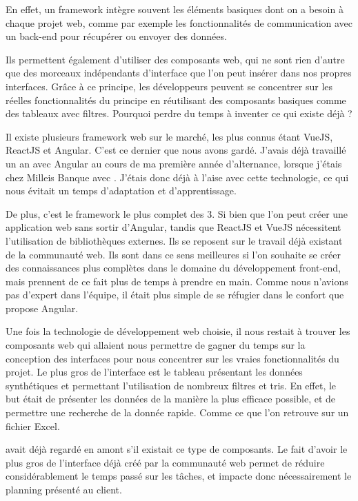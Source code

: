 En effet, un \gls{framework} intègre souvent les éléments basiques dont on a besoin à chaque projet web, comme par exemple les fonctionnalités de communication avec un \gls{back-end} pour récupérer ou envoyer des données.

Ils permettent également d'utiliser des \og composants \fg web, qui ne sont rien d'autre que des morceaux indépendants d'interface que l'on peut insérer dans nos propres interfaces. Grâce à ce principe, les développeurs peuvent se concentrer sur les réelles fonctionnalités du principe en réutilisant des composants basiques comme des tableaux avec filtres. Pourquoi perdre du temps à inventer ce qui existe déjà ?

Il existe plusieurs \gls{framework} web sur le marché, les plus connus étant VueJS\cite{noauthor_vuejs_nodate}, ReactJS\cite{noauthor_react_nodate} et Angular\cite{noauthor_angular_nodate}. C'est ce dernier que nous avons gardé. J'avais déjà travaillé un an avec Angular au cours de ma première année d'alternance, lorsque j'étais chez Milleis Banque avec \damien. J'étais donc déjà à l'aise avec cette technologie, ce qui nous évitait un temps d'adaptation et d'apprentissage.

De plus, c'est le \gls{framework} le plus complet des 3. Si bien que l'on peut créer une application web sans sortir d'Angular, tandis que ReactJS et VueJS nécessitent l'utilisation de bibliothèques externes. Ils se reposent sur le travail déjà existant de la communauté web. Ils sont dans ce sens meilleures si l'on souhaite se créer des connaissances plus complètes dans le domaine du développement \gls{front-end}, mais prennent de ce fait plus de temps à prendre en main. Comme nous n'avions pas d'expert dans l'équipe, il était plus simple de se réfugier dans le confort que propose Angular.

Une fois la technologie de développement web choisie, il nous restait à trouver les composants web qui allaient nous permettre de gagner du temps sur la conception des interfaces pour nous concentrer sur les vraies fonctionnalités du projet.
Le plus gros de l'interface est le tableau présentant les données synthétiques et permettant l'utilisation de nombreux filtres et tris. En effet, le but était de présenter les données de la manière la plus efficace possible, et de permettre une recherche de la donnée rapide. Comme ce que l'on retrouve sur un fichier Excel.

\damien avait déjà regardé en amont s'il existait ce type de composants. Le fait d'avoir le plus gros de l'interface déjà créé par la communauté web permet de réduire considérablement le temps passé sur les tâches, et impacte donc nécessairement le planning présenté au client.

